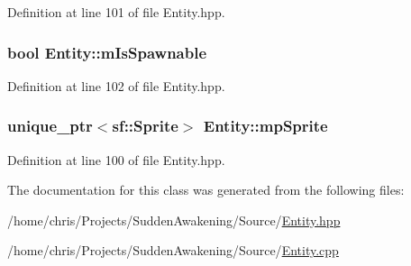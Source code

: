 Definition at line 101 of file Entity.\-hpp.

\hypertarget{class_entity_a13cc8677fa51642cc3d60c13e9566dab}{
\subsubsection[{m\-Is\-Spawnable}]{\setlength{\rightskip}{0pt plus 5cm}bool Entity\-::m\-Is\-Spawnable\hspace{0.3cm}{\ttfamily [protected]}}}\label{class_entity_a13cc8677fa51642cc3d60c13e9566dab}


Definition at line 102 of file Entity.\-hpp.

\hypertarget{class_entity_a52b9048640f6ffadfbc3e93d6184fe1f}{
\subsubsection[{mp\-Sprite}]{\setlength{\rightskip}{0pt plus 5cm}unique\-\_\-ptr$<$sf\-::\-Sprite$>$ Entity\-::mp\-Sprite\hspace{0.3cm}{\ttfamily [protected]}}}\label{class_entity_a52b9048640f6ffadfbc3e93d6184fe1f}


Definition at line 100 of file Entity.\-hpp.



The documentation for this class was generated from the following files\-:\begin{DoxyCompactItemize}
\item 
/home/chris/\-Projects/\-Sudden\-Awakening/\-Source/\hyperlink{_entity_8hpp}{Entity.\-hpp}\item 
/home/chris/\-Projects/\-Sudden\-Awakening/\-Source/\hyperlink{_entity_8cpp}{Entity.\-cpp}\end{DoxyCompactItemize}
